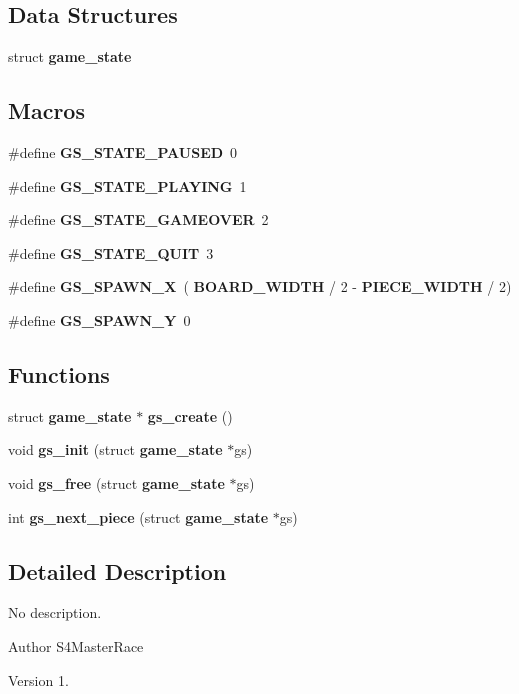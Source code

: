 \subsection*{Data Structures}
\begin{DoxyCompactItemize}
\item 
struct \textbf{ game\+\_\+state}
\end{DoxyCompactItemize}
\subsection*{Macros}
\begin{DoxyCompactItemize}
\item 
\#define \textbf{ G\+S\+\_\+\+S\+T\+A\+T\+E\+\_\+\+P\+A\+U\+S\+ED}~0
\item 
\#define \textbf{ G\+S\+\_\+\+S\+T\+A\+T\+E\+\_\+\+P\+L\+A\+Y\+I\+NG}~1
\item 
\#define \textbf{ G\+S\+\_\+\+S\+T\+A\+T\+E\+\_\+\+G\+A\+M\+E\+O\+V\+ER}~2
\item 
\#define \textbf{ G\+S\+\_\+\+S\+T\+A\+T\+E\+\_\+\+Q\+U\+IT}~3
\item 
\#define \textbf{ G\+S\+\_\+\+S\+P\+A\+W\+N\+\_\+X}~(\textbf{ B\+O\+A\+R\+D\+\_\+\+W\+I\+D\+TH} / 2 -\/ \textbf{ P\+I\+E\+C\+E\+\_\+\+W\+I\+D\+TH} / 2)
\item 
\#define \textbf{ G\+S\+\_\+\+S\+P\+A\+W\+N\+\_\+Y}~0
\end{DoxyCompactItemize}
\subsection*{Functions}
\begin{DoxyCompactItemize}
\item 
struct \textbf{ game\+\_\+state} $\ast$ \textbf{ gs\+\_\+create} ()
\item 
void \textbf{ gs\+\_\+init} (struct \textbf{ game\+\_\+state} $\ast$gs)
\item 
void \textbf{ gs\+\_\+free} (struct \textbf{ game\+\_\+state} $\ast$gs)
\item 
int \textbf{ gs\+\_\+next\+\_\+piece} (struct \textbf{ game\+\_\+state} $\ast$gs)
\end{DoxyCompactItemize}


\subsection{Detailed Description}
No description. 

\begin{DoxyAuthor}{Author}
S4\+Master\+Race 
\end{DoxyAuthor}
\begin{DoxyVersion}{Version}
1. 
\end{DoxyVersion}


